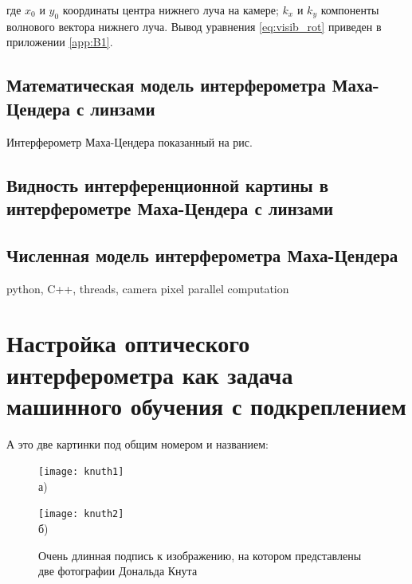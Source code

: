 где $x_0$ и $y_0$ координаты центра нижнего луча на камере; $k_x$ и $k_y$ компоненты волнового вектора нижнего луча. Вывод уравнения \ref{eq:visib_rot} приведен в приложении \ref{app:B1}.

\subsection{Математическая модель интерферометра Маха-Цендера с линзами}

Интерферометр Маха-Цендера показанный на рис.


\subsection{Видность интерференционной картины в интерферометре Маха-Цендера с линзами}

\subsection{Численная модель интерферометра Маха-Цендера}

python, C++, threads, camera pixel parallel computation


\section{Настройка оптического интерферометра как задача машинного обучения с подкреплением}\label{sec:ch2/sect2}

А это две картинки под общим номером и названием:
\begin{figure}[ht]
    \begin{minipage}[b][][b]{0.49\linewidth}\centering
        \texttt{[image: knuth1]} \\ а)
    \end{minipage}
    \hfill
    \begin{minipage}[b][][b]{0.49\linewidth}\centering
        \texttt{[image: knuth2]} \\ б)
    \end{minipage}
    \caption{Очень длинная подпись к изображению,
        на котором представлены две фотографии Дональда Кнута}
    \label{fig:knuth}
\end{figure}

